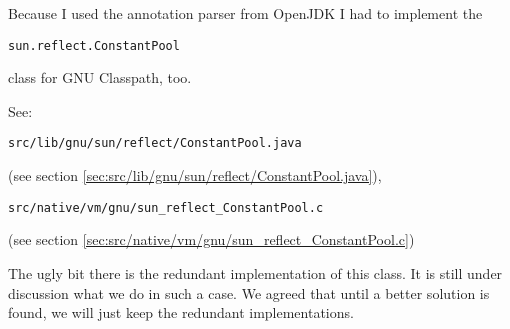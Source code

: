 \documentclass[a4paper, 10pt, titlepage]{scrartcl} %
\begin{document}
Because I used the annotation parser from OpenJDK I had to implement the
\begin{scriptsize}\verb|sun|\hspace{0.0pt}\verb|.|\hspace{0.0pt}\verb|reflect|\hspace{0.0pt}\verb|.|\hspace{0.0pt}\verb|ConstantPool|\end{scriptsize} class for GNU Classpath, too.

See: \begin{scriptsize}\verb|src|\hspace{0.0pt}\verb|/|\hspace{0.0pt}\verb|lib|\hspace{0.0pt}\verb|/|\hspace{0.0pt}\verb|gnu|\hspace{0.0pt}\verb|/|\hspace{0.0pt}\verb|sun|\hspace{0.0pt}\verb|/|\hspace{0.0pt}\verb|reflect|\hspace{0.0pt}\verb|/|\hspace{0.0pt}\verb|ConstantPool|\hspace{0.0pt}\verb|.|\hspace{0.0pt}\verb|java|\end{scriptsize} (see section \ref{sec:src/lib/gnu/sun/reflect/ConstantPool.java}),
\begin{scriptsize}\verb|src|\hspace{0.0pt}\verb|/|\hspace{0.0pt}\verb|native|\hspace{0.0pt}\verb|/|\hspace{0.0pt}\verb|vm|\hspace{0.0pt}\verb|/|\hspace{0.0pt}\verb|gnu|\hspace{0.0pt}\verb|/|\hspace{0.0pt}\verb|sun_reflect_ConstantPool|\hspace{0.0pt}\verb|.|\hspace{0.0pt}\verb|c|\end{scriptsize} (see section \ref{sec:src/native/vm/gnu/sun_reflect_ConstantPool.c})

The ugly bit there is the redundant implementation of this class. It is still
under discussion what we do in such a case. We agreed that until a better
solution is found, we will just keep the redundant implementations.
\end{document}
